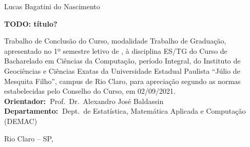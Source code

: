 \documentclass[12pt,a4paper]{article}
\begin{document}
\thispagestyle{empty}
\begin{titlepage}
	\begin{center}
		{\large \textsf{Lucas Bagatini do Nascimento}}

		\vspace{3cm}

		{\LARGE \textbf{\textsf{TODO: título?}}}
	\end{center}

	\vspace{3cm}

	\hfill
		\begin{minipage}[c]{0.6\columnwidth}
			Trabalho de Conclusão do Curso, modalidade Trabalho de Graduação, apresentado
			no 1º semestre letivo de \the\year,  à disciplina ES/TG do Curso de Bacharelado em Ciências
			da Computação, período Integral, do Instituto de Geociências e Ciências Exatas
			da Universidade Estadual Paulista “Júlio de Mesquita Filho”, campus de Rio Claro,
			para apreciação segundo as normas estabelecidas pelo Conselho do Curso, em 02/09/2021.\\

			\textbf{Orientador:~}\textsf{Prof.~Dr.~Alexandro José Baldassin} \\
			\textbf{Departamento:~}\textsf{Dept.~de Estatística, Matemática Aplicada e Computação (DEMAC)}
		\end{minipage}

	\vfill

	\begin{center}
		Rio Claro -- SP,\\
		\the\year
	\end{center}

\end{titlepage}
\end{document}
